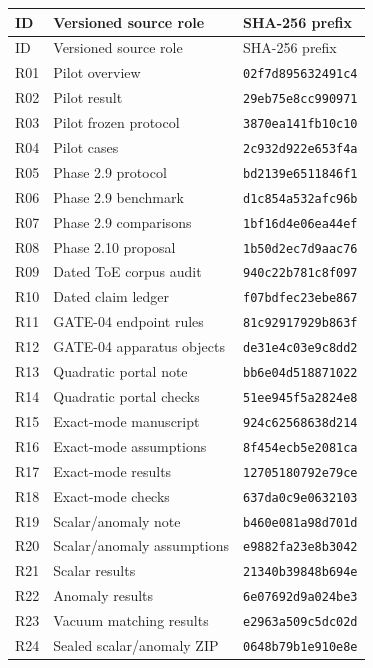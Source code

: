 \small
\begin{longtable}{@{}p{.08\linewidth}>{\raggedright\arraybackslash}p{.52\linewidth}p{.31\linewidth}@{}}
\toprule ID & Versioned source role & SHA-256 prefix\\\midrule
\endfirsthead
\toprule ID & Versioned source role & SHA-256 prefix\\\midrule\endhead
\bottomrule\endfoot
R01 & Pilot overview & \texttt{02f7d895632491c4}\\
R02 & Pilot result & \texttt{29eb75e8cc990971}\\
R03 & Pilot frozen protocol & \texttt{3870ea141fb10c10}\\
R04 & Pilot cases & \texttt{2c932d922e653f4a}\\
R05 & Phase 2.9 protocol & \texttt{bd2139e6511846f1}\\
R06 & Phase 2.9 benchmark & \texttt{d1c854a532afc96b}\\
R07 & Phase 2.9 comparisons & \texttt{1bf16d4e06ea44ef}\\
R08 & Phase 2.10 proposal & \texttt{1b50d2ec7d9aac76}\\
R09 & Dated ToE corpus audit & \texttt{940c22b781c8f097}\\
R10 & Dated claim ledger & \texttt{f07bdfec23ebe867}\\
R11 & GATE-04 endpoint rules & \texttt{81c92917929b863f}\\
R12 & GATE-04 apparatus objects & \texttt{de31e4c03e9c8dd2}\\
R13 & Quadratic portal note & \texttt{bb6e04d518871022}\\
R14 & Quadratic portal checks & \texttt{51ee945f5a2824e8}\\
R15 & Exact-mode manuscript & \texttt{924c62568638d214}\\
R16 & Exact-mode assumptions & \texttt{8f454ecb5e2081ca}\\
R17 & Exact-mode results & \texttt{12705180792e79ce}\\
R18 & Exact-mode checks & \texttt{637da0c9e0632103}\\
R19 & Scalar/anomaly note & \texttt{b460e081a98d701d}\\
R20 & Scalar/anomaly assumptions & \texttt{e9882fa23e8b3042}\\
R21 & Scalar results & \texttt{21340b39848b694e}\\
R22 & Anomaly results & \texttt{6e07692d9a024be3}\\
R23 & Vacuum matching results & \texttt{e2963a509c5dc02d}\\
R24 & Sealed scalar/anomaly ZIP & \texttt{0648b79b1e910e8e}\\
\end{longtable}
\normalsize
